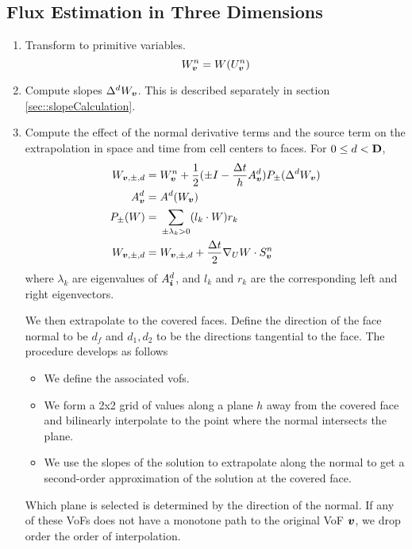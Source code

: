 \subsection{Flux Estimation in Three Dimensions}

\begin{enumerate}
\item Transform to primitive variables.  
\begin{equation}
W^n_{\boldsymbol{v}} = W(U^n_{\boldsymbol{v}})
\end{equation}

\item Compute slopes $\Delta^d W_{\boldsymbol{v}}$.  This is described
      separately in section \ref{sec::slopeCalculation}.

\item Compute the effect of the normal derivative terms and the source
term on the extrapolation in space and time from cell centers to
faces.  For $0 \le d < {\mathbf{D}}$,
\begin{align}
\begin{split}
W_{{\boldsymbol{v}}, \pm, d} = & \;
  W^n_{\boldsymbol{v}} +
  \frac{1}{2} (\pm I - \frac{\Delta t}{h} A^d_{\boldsymbol{v}}) P_\pm (\Delta^d W_{\boldsymbol{v}}) \\
A^d_{\boldsymbol{v}} = & \; A^d(W_{{\boldsymbol{v}}}) \\
P_\pm(W) = & \; \sum\limits_{\pm \lambda_k > 0} (l_k \cdot W) r_k \\
W_{{\boldsymbol{v}}, \pm, d} =  & \; W_{{\boldsymbol{v}}, \pm, d} + \frac{\Delta t}{2} \nabla_U W 
\cdot S^n_{\boldsymbol{v}} 
\end{split}
\label{eqn::normalPred}
\end{align}
where $\lambda_k$ are eigenvalues of $A^d_{\boldsymbol{i}}$, and 
$l_k$ and $r_k$ are the corresponding left and right eigenvectors. 

We then extrapolate to the covered faces.  Define the direction of the
face normal to be $d_f$ and $d_1, d_2$ to be the directions
tangential to the face.  The procedure develops as follows
\begin{itemize}
\item We define the associated vofs.
\item We form a 2x2 grid of values along a plane $h$ away from the 
covered face and bilinearly interpolate to the point where the normal
intersects the plane.
\item We use the slopes of the solution to extrapolate along 
the normal to get a second-order approximation of the solution at the
covered face.
\end{itemize}
Which plane is selected is determined by the direction of the normal.
If any of these VoFs does not have a monotone path to the original
VoF ${\boldsymbol{v}}$, we drop order the order of interpolation.



\end{enumerate}
